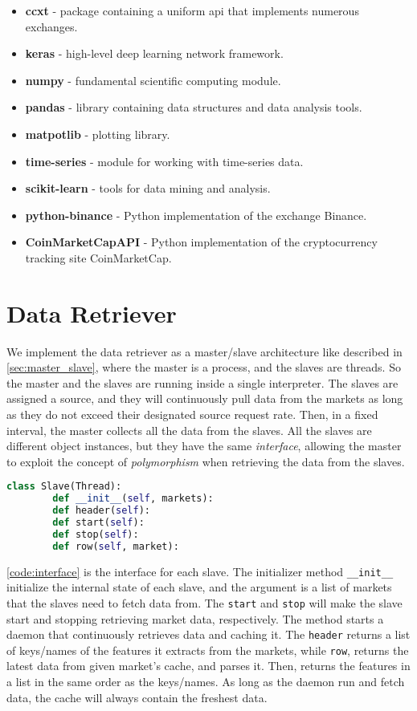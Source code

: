 \begin{itemize}
    \item \textbf{ccxt} - package containing a uniform \ac{api} that implements numerous exchanges.
    \item \textbf{keras} - high-level deep learning network framework.
    \item \textbf{numpy} - fundamental scientific computing module.
    \item \textbf{pandas} - library containing data structures and data analysis tools.
    \item \textbf{matpotlib} - plotting library.
    \item \textbf{time-series} - module for working with time-series data.  
    \item \textbf{scikit-learn} - tools for data mining and analysis.
    \item \textbf{python-binance} - Python implementation of the exchange Binance.
    \item \textbf{CoinMarketCapAPI} - Python implementation of the cryptocurrency tracking site CoinMarketCap.
\end{itemize}

\section{Data Retriever}
We implement the data retriever as a master/slave architecture like described in \autoref{sec:master_slave}, where the master is a process, and the slaves are threads. So the master and the slaves are running inside a single interpreter. The slaves are assigned a source, and they will continuously pull data from the markets as long as they do not exceed their designated source request rate. Then, in a fixed interval, the master collects all the data from the slaves. All the slaves are different object instances, but they have the same \emph{interface}, allowing the master to exploit the concept of \emph{polymorphism} when retrieving the data from the slaves.

\begin{lstlisting}[language=python, caption={Data retriever's slave interface}, label=code:interface]
    class Slave(Thread):
        def __init__(self, markets):
        def header(self):
        def start(self):
        def stop(self):
        def row(self, market):
\end{lstlisting}

\autoref{code:interface} is the interface for each slave. The initializer method \texttt{\_\_init\_\_} initialize the internal state of each slave, and the argument is a list of markets that the slaves need to fetch data from. The \texttt{start} and \texttt{stop} will make the slave start and stopping retrieving market data, respectively. The  method starts a daemon that continuously retrieves data and caching it. The \texttt{header} returns a list of keys/names of the features it extracts from the markets, while \texttt{row}, returns the latest data from given market's cache, and parses it. Then, returns the features in a list in the same order as the keys/names. As long as the daemon run and fetch data, the cache will always contain the freshest data.

